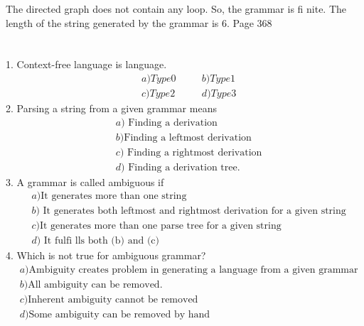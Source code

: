 \documentclass[12pt,a4paper]{book}
\begin{document}
\begin{center}
 \end{center}
The directed graph does not contain any loop. So, the grammar is fi nite. The length of the
string generated by the grammar is 6.\newpage
Page $368$\\\\\\
1. Context-free language is language.
\begin{align*}
&a) Type 0 \quad  &&b) Type 1\\
&c) Type 2 &&d) Type 3
\end{align*}
2. Parsing a string from a given grammar means
\begin{align*}
&a)\text{ Finding a derivation}\\
&b) \text{Finding a leftmost derivation}\\
&c)\text{ Finding a rightmost derivation}\\
&d)\text{ Finding a derivation tree.}
\end{align*}
3. A grammar is called ambiguous if
\begin{align*}
&a) \text{It generates more than one string}\\
&b)\text{ It generates both leftmost and rightmost derivation for a given string}\\
&c) \text{It generates more than one parse tree for a given string}\\
&d)\text{ It fulfi lls both (b) and (c)}
\end{align*}
4. Which is not true for ambiguous grammar?
\begin{align*}
&a) \text{Ambiguity creates problem in generating a language from a given grammar}\\
&b) \text{All ambiguity can be removed.}\\
&c) \text{Inherent ambiguity cannot be removed}\\
&d) \text{Some ambiguity can be removed by hand}
\end{align*}
\end{document}
